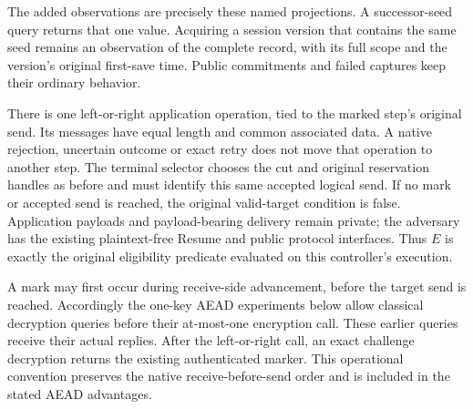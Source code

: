 \documentclass[pdflatex]{sn-jnl}
\theoremstyle{thmstyleone}
\theoremstyle{thmstylethree}
\theoremstyle{thmstyletwo}
\begin{document}
The added observations are precisely these named projections. A
successor-seed query returns that one value. Acquiring a session version
that contains the same seed remains an observation of the complete record, with
its full scope and the version's original first-save time. Public
commitments and failed captures keep their ordinary behavior.

There is one left-or-right application operation, tied to the marked
step's original send. Its messages have equal length and common
associated data. A native rejection, uncertain outcome or exact retry
does not move that operation to another step. The terminal selector
chooses the cut and original reservation handles as before and must
identify this same accepted logical send. If no mark or accepted send
is reached, the original valid-target condition is false. Application
payloads and payload-bearing delivery remain private; the adversary
has the existing plaintext-free Resume and public protocol interfaces.
Thus $E$ is exactly the original eligibility predicate evaluated on
this controller's execution.

A mark may first occur during receive-side advancement, before the
target send is reached. Accordingly the one-key AEAD experiments below
allow classical decryption queries before their at-most-one encryption
call. These earlier queries receive their actual replies. After the
left-or-right call, an exact challenge decryption returns the existing
authenticated marker. This operational convention preserves the
native receive-before-send order and is included in the stated AEAD
advantages.
\end{document}
